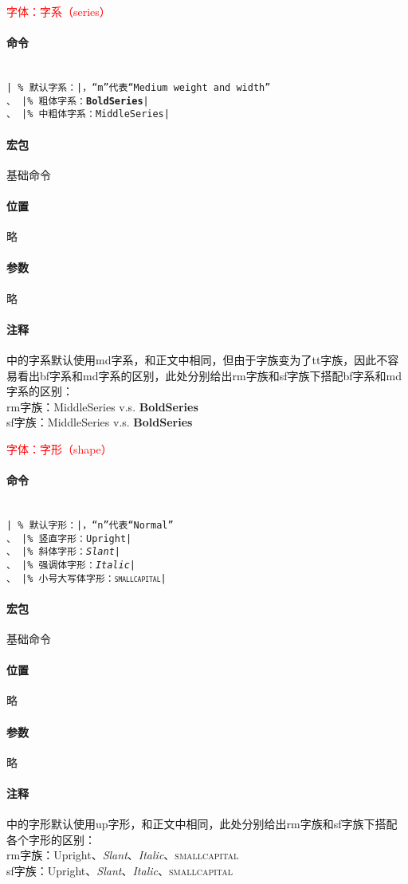 \documentclass{article}
\newcommand{\mnt}[1]{\texttt{#1}} %
\newcommand{\notes}[6]{
    \begin{mdframed}
        {\begin{center}\large\textcolor{red}{#1}\end{center}}
        \paragraph{命令}~\vspace{10pt}\\#2
        \paragraph{宏包}#3
        \paragraph{位置}#4
        \paragraph{参数}#5
        \paragraph{注释}#6
    \end{mdframed}
}
\begin{document}
\notes
{字体：字系（series）}%
{
    \mnt{\seriesdefault |~\% 默认字系：\seriesdefault|，“m”代表“Medium weight and width”}\\
    \mnt{\textbf{}、{\bfseries} |\% 粗体字系：\textbf{BoldSeries}|}\\
    \mnt{\textmd{}、{\mdseries} |\% 中粗体字系：\textmd{MiddleSeries}|}
}%
{基础命令}%
{略}%
{略}%
{
    \mnt{\texttt{}}中的字系默认使用md字系，和正文中相同，但由于字族变为了tt字族，因此不容易看出bf字系和md字系的区别，此处分别给出rm字族和sf字族下搭配bf字系和md字系的区别：\\
    rm字族：\textrm{MiddleSeries v.s. \textbf{BoldSeries}}\\
    sf字族：\textsf{MiddleSeries v.s. \textbf{BoldSeries}}
}%

\notes
{字体：字形（shape）}%
{
    \mnt{\shapedefault |~\% 默认字形：\shapedefault|，“n”代表“Normal”}\\
    \mnt{\textup{}、{\upshape} |\% 竖直字形：\textup{Upright}|}\\
    \mnt{\textsl{}、{\slshape} |\% 斜体字形：\textsl{Slant}|}\\
    \mnt{\textit{}、{\itshape} |\% 强调体字形：\textit{Italic}|}\\
    \mnt{\textsc{}、{\scshape} |\% 小号大写体字形：\textsc{smallcapital}|}
}%
{基础命令}%
{略}%
{略}%
{
    \mnt{\texttt{}}中的字形默认使用up字形，和正文中相同，此处分别给出rm字族和sf字族下搭配各个字形的区别：\\
    rm字族：\textup{Upright}、\textsl{Slant}、\textit{Italic}、\textsc{smallcapital}\\
    sf字族：\textsf{\textup{Upright}、\textsl{Slant}、\textit{Italic}、\textsc{smallcapital}}
}%
\end{document}
